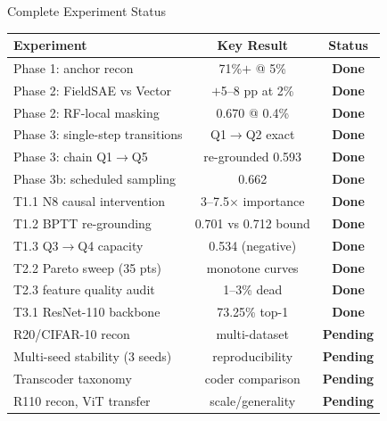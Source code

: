 \documentclass[final]{beamer}
\newlength{\colwidth}
\begin{document}
\begin{frame}[t]
\begin{columns}[t]
\begin{column}{\colwidth}
\begin{block}{Complete Experiment Status}
\small
\begin{center}
\begin{tabular}{@{}lcc@{}}
\toprule
\textbf{Experiment} & \textbf{Key Result} & \textbf{Status} \\
\midrule
Phase 1: anchor recon & 71\%$+$ @ 5\% & \textcolor{AccentGreen}{\textbf{Done}} \\
Phase 2: FieldSAE vs Vector & $+$5--8 pp at 2\% & \textcolor{AccentGreen}{\textbf{Done}} \\
Phase 2: RF-local masking & 0.670 @ 0.4\% & \textcolor{AccentGreen}{\textbf{Done}} \\
Phase 3: single-step transitions & Q1$\to$Q2 exact & \textcolor{AccentGreen}{\textbf{Done}} \\
Phase 3: chain Q1$\to$Q5 & re-grounded 0.593 & \textcolor{AccentGreen}{\textbf{Done}} \\
Phase 3b: scheduled sampling & 0.662 & \textcolor{AccentGreen}{\textbf{Done}} \\
T1.1 N8 causal intervention & 3--7.5$\times$ importance & \textcolor{AccentGreen}{\textbf{Done}} \\
T1.2 BPTT re-grounding & 0.701 vs 0.712 bound & \textcolor{AccentGreen}{\textbf{Done}} \\
T1.3 Q3$\to$Q4 capacity & 0.534 (negative) & \textcolor{AccentGreen}{\textbf{Done}} \\
T2.2 Pareto sweep (35 pts) & monotone curves & \textcolor{AccentGreen}{\textbf{Done}} \\
T2.3 feature quality audit & 1--3\% dead & \textcolor{AccentGreen}{\textbf{Done}} \\
T3.1 ResNet-110 backbone & 73.25\% top-1 & \textcolor{AccentGreen}{\textbf{Done}} \\
\midrule
R20/CIFAR-10 recon & multi-dataset & \textcolor{AccentOrange}{\textbf{Pending}} \\
Multi-seed stability (3 seeds) & reproducibility & \textcolor{AccentOrange}{\textbf{Pending}} \\
Transcoder taxonomy & coder comparison & \textcolor{AccentOrange}{\textbf{Pending}} \\
R110 recon, ViT transfer & scale/generality & \textcolor{AccentOrange}{\textbf{Pending}} \\
\bottomrule
\end{tabular}
\end{center}
\end{block}


\end{column}
\end{columns}
\end{frame}
\end{document}
